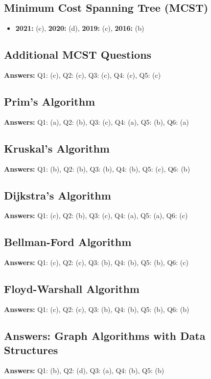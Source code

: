 \subsection*{Minimum Cost Spanning Tree (MCST)}
\begin{itemize}
    \item \textbf{2021:} (c), \quad \textbf{2020:} (d), \quad \textbf{2019:} (c), \quad \textbf{2016:} (b)
\end{itemize}

\subsection*{Additional MCST Questions}
\noindent\textbf{Answers:} Q1: (c), Q2: (c), Q3: (c), Q4: (c), Q5: (c)

\subsection*{Prim's Algorithm}
\noindent\textbf{Answers:} Q1: (a), Q2: (b), Q3: (c), Q4: (a), Q5: (b), Q6: (a)

\subsection*{Kruskal's Algorithm}
\noindent\textbf{Answers:} Q1: (b), Q2: (b), Q3: (b), Q4: (b), Q5: (c), Q6: (b)

\subsection*{Dijkstra's Algorithm}
\noindent\textbf{Answers:} Q1: (c), Q2: (b), Q3: (c), Q4: (a), Q5: (a), Q6: (c)

\subsection*{Bellman-Ford Algorithm}
\noindent\textbf{Answers:} Q1: (c), Q2: (c), Q3: (b), Q4: (b), Q5: (b), Q6: (c)

\subsection*{Floyd-Warshall Algorithm}
\noindent\textbf{Answers:} Q1: (c), Q2: (c), Q3: (b), Q4: (b), Q5: (b), Q6: (b)

\subsection*{Answers: Graph Algorithms with Data Structures}
\noindent\textbf{Answers:} Q1: (b), Q2: (d), Q3: (a), Q4: (b), Q5: (b)

